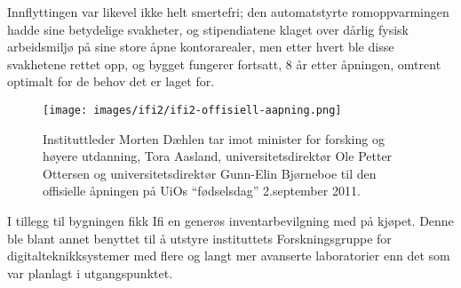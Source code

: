 Innflyttingen var likevel ikke helt smertefri; den automatstyrte romoppvarmingen hadde sine betydelige svakheter, og stipendiatene klaget over dårlig fysisk arbeidsmiljø på sine store åpne kontorarealer, men etter hvert ble disse svakhetene rettet opp, og bygget fungerer fortsatt, 8 år etter åpningen, omtrent optimalt for de behov det er laget for.

\begin{figure}[h!]
	\texttt{[image: images/ifi2/ifi2-offisiell-aapning.png]}
	\caption{Instituttleder Morten Dæhlen tar imot minister for forsking og høyere utdanning, Tora Aasland, universitetsdirektør Ole Petter Ottersen og universitetsdirektør Gunn-Elin Bjørneboe til den offisielle åpningen på UiOs ``fødselsdag'' 2.september 2011.}
\end{figure}

I tillegg til bygningen fikk Ifi en generøs inventarbevilgning med på kjøpet. Denne ble blant annet benyttet til å utstyre instituttets Forskningsgruppe for digitalteknikksystemer med flere og langt mer avanserte laboratorier enn det som var planlagt i utgangspunktet.
